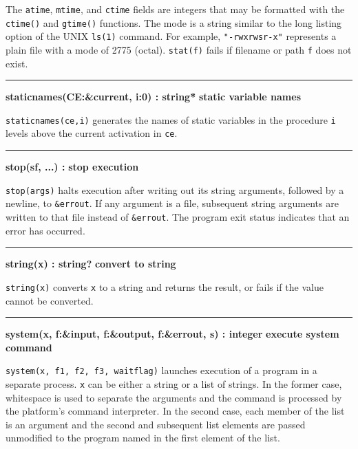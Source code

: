 The \texttt{atime}, \texttt{mtime}, and \texttt{ctime} fields are
integers that may be formatted with the \texttt{ctime()} and
\texttt{gtime()} functions. The mode is a string similar to the long
listing option of the UNIX \texttt{ls(1)} command. For example,
\texttt{"-rwxrwsr-x"} represents a plain
file with a mode of 2775 (octal). \texttt{stat(f)} fails if filename or
path \texttt{f} does not exist.

\bigskip\hrule\vspace{0.1cm}
\noindent
{\bf staticnames(CE:\&current, i:0) : string* } \hfill {\bf static variable names}

\noindent
{}\texttt{staticnames(ce,i)} generates the names of static
variables in the procedure \texttt{i} levels above the current
activation in \texttt{ce}.

\bigskip\hrule\vspace{0.1cm}
\noindent
{\bf stop(s{\textbar}f, ...) : } \hfill {\bf stop execution}

\noindent
{}\texttt{stop(args)} halts execution after
writing out its string arguments, followed by a newline, to
\texttt{\&errout}. If any argument is a file, subsequent string
arguments are written to that file instead of \texttt{\&errout}. The
program exit status indicates that an error has occurred.

\bigskip\hrule\vspace{0.1cm}
\noindent
{\bf string(x) : string? } \hfill {\bf convert to string}

\noindent
{}\texttt{string(x)} converts
\texttt{x} to a string and returns the result, or fails if the value
cannot be converted.

\bigskip\hrule\vspace{0.1cm}
\noindent
{\bf system(x, f:\&input, f:\&output, f:\&errout, s) : integer } \hfill {\bf execute system command}

\noindent
{}\texttt{system(x, f1, f2, f3, waitflag)} launches
execution of a program in a separate process. \texttt{x} can be either
a string or a list of strings. In the former case, whitespace is used
to separate the arguments and the command is processed by the
platform's command interpreter. In the second case,
each member of the list is an argument and the second and subsequent
list elements are passed unmodified to the program named in the first
element of the list.

